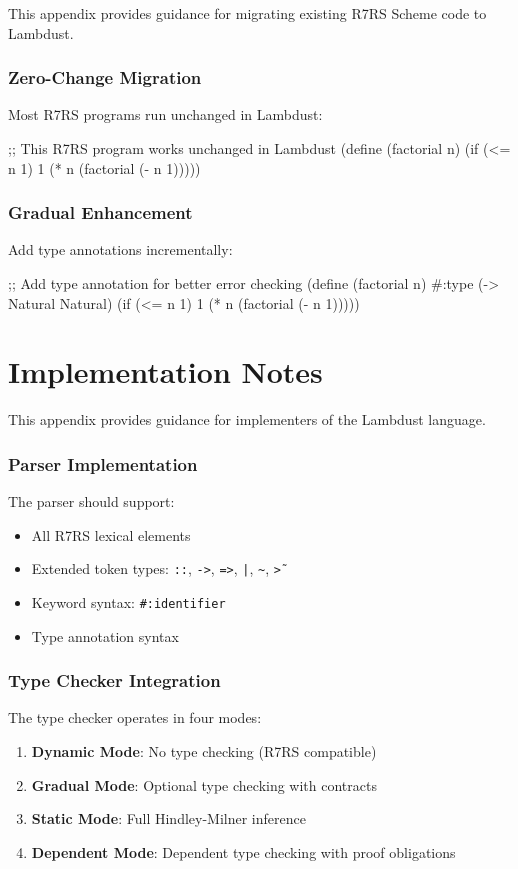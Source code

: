\documentclass[twoside,twocolumn]{algol60}
\begin{document}
This appendix provides guidance for migrating existing R7RS Scheme code to Lambdust.

\subsection{Zero-Change Migration}
Most R7RS programs run unchanged in Lambdust:

\begin{lambdustcode}
;; This R7RS program works unchanged in Lambdust
(define (factorial n)
  (if (<= n 1)
      1
      (* n (factorial (- n 1)))))
\end{lambdustcode}

\subsection{Gradual Enhancement}
Add type annotations incrementally:

\begin{lambdustcode}
;; Add type annotation for better error checking
(define (factorial n)
  #:type (-> Natural Natural)
  (if (<= n 1)
      1
      (* n (factorial (- n 1)))))
\end{lambdustcode}

\chapter{Implementation Notes}
\label{app:implementation}

This appendix provides guidance for implementers of the Lambdust language.

\subsection{Parser Implementation}
The parser should support:
\begin{itemize}
\item All R7RS lexical elements
\item Extended token types: \texttt{::}, \texttt{->}, \texttt{=>}, \texttt{|}, \texttt{\~}, \texttt{\~>}
\item Keyword syntax: \texttt{\#:identifier}
\item Type annotation syntax
\end{itemize}

\subsection{Type Checker Integration}
The type checker operates in four modes:
\begin{enumerate}
\item \textbf{Dynamic Mode}: No type checking (R7RS compatible)
\item \textbf{Gradual Mode}: Optional type checking with contracts
\item \textbf{Static Mode}: Full Hindley-Milner inference
\item \textbf{Dependent Mode}: Dependent type checking with proof obligations
\end{enumerate}
\end{document}
